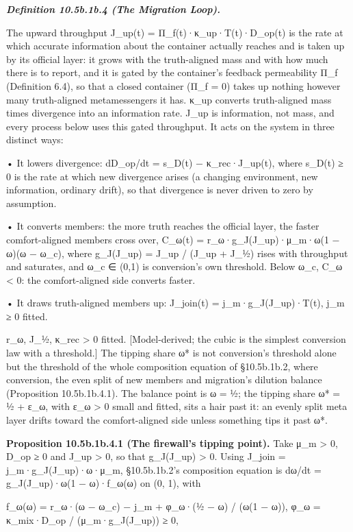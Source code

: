\documentclass[
]{article}
\begin{document}
\emph{\textbf{Definition 10.5b.1b.4 (The Migration Loop).}}

The upward throughput J\_up(t) = Π\_f(t)·κ\_up·T(t)·D\_op(t) is the rate
at which accurate information about the container actually reaches and
is taken up by its official layer: it grows with the truth-aligned mass
and with how much there is to report, and it is gated by the container's
feedback permeability Π\_f (Definition 6.4), so that a closed container
(Π\_f = 0) takes up nothing however many truth-aligned metamessengers it
has. κ\_up converts truth-aligned mass times divergence into an
information rate. J\_up is information, not mass, and every process
below uses this gated throughput. It acts on the system in three
distinct ways:

• It lowers divergence: dD\_op/dt = s\_D(t) − κ\_rec·J\_up(t), where
s\_D(t) ≥ 0 is the rate at which new divergence arises (a changing
environment, new information, ordinary drift), so that divergence is
never driven to zero by assumption.

• It converts members: the more truth reaches the official layer, the
faster comfort-aligned members cross over, C\_ω(t) =
r\_ω·g\_J(J\_up)·μ\_m·ω(1 − ω)(ω − ω\_c), where g\_J(J\_up) = J\_up /
(J\_up + J\_½) rises with throughput and saturates, and ω\_c ∈ (0,1) is
conversion's own threshold. Below ω\_c, C\_ω \textless{} 0: the
comfort-aligned side converts faster.

• It draws truth-aligned members up: J\_join(t) = j\_m·g\_J(J\_up)·T(t),
j\_m ≥ 0 fitted.

r\_ω, J\_½, κ\_rec \textgreater{} 0 fitted. {[}Model-derived; the cubic
is the simplest conversion law with a threshold.{]} The tipping share ω*
is not conversion's threshold alone but the threshold of the whole
composition equation of §10.5b.1b.2, where conversion, the even split of
new members and migration's dilution balance (Proposition 10.5b.1b.4.1).
The balance point is ω = ½; the tipping share ω* = ½ + ε\_ω, with ε\_ω
\textgreater{} 0 small and fitted, sits a hair past it: an evenly split
meta layer drifts toward the comfort-aligned side unless something tips
it past ω*.

\textbf{Proposition 10.5b.1b.4.1 (The firewall's tipping point).} Take
μ\_m \textgreater{} 0, D\_op ≥ 0 and J\_up \textgreater{} 0, so that
g\_J(J\_up) \textgreater{} 0. Using J\_join = j\_m·g\_J(J\_up)·ω·μ\_m,
§10.5b.1b.2's composition equation is dω/dt = g\_J(J\_up)·ω(1 −
ω)·f\_ω(ω) on (0, 1), with

f\_ω(ω) = r\_ω·(ω − ω\_c) − j\_m + φ\_ω·(½ − ω) / (ω(1 − ω)), φ\_ω =
κ\_mix·D\_op / (μ\_m·g\_J(J\_up)) ≥ 0,
\end{document}
